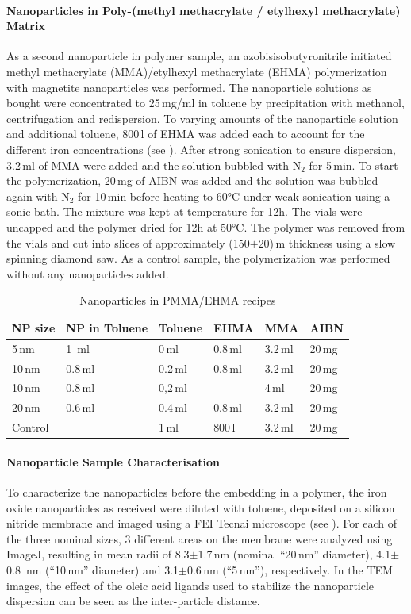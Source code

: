 \paragraph{Nanoparticles in Poly-(methyl methacrylate / etylhexyl methacrylate)  Matrix}
As a second nanoparticle in polymer sample, an azobisisobutyronitrile initiated methyl methacrylate (MMA)/etylhexyl methacrylate (EHMA) polymerization with magnetite nanoparticles was performed. 
The nanoparticle solutions as bought were concentrated to 25\,mg/ml in toluene by precipitation with methanol, centrifugation and redispersion.  To varying amounts of the nanoparticle solution and additional toluene, 800\,\textmu l of EHMA was added each to account for the different iron concentrations (see ). After strong sonication to ensure dispersion, 3.2\,ml of MMA were added and the solution  bubbled with N$_2$ for 5\,min. To start the polymerization, 20\,mg of AIBN was added and the solution was bubbled again with N$_2$  for 10\,min before heating to 60°C under weak sonication using a sonic bath. The mixture was kept at temperature for 12h.
The vials were uncapped and the polymer dried for 12h at 50°C. The polymer was removed from the vials and cut into slices of approximately (150$\pm$20)\,\textmu m thickness using a slow spinning diamond saw.
As a control sample, the polymerization was performed without any nanoparticles added.

\begin{table}[tp]
	\centering
	\caption{Nanoparticles in PMMA/EHMA recipes}
	\label{tab:sampleCP}
	\begin{tabular}{llllll}
		\hline
		NP size &NP in Toluene&Toluene & EHMA & MMA & AIBN \\
		\hline
		5\,nm&1 \,ml & 0\,ml&0.8\,ml&  3.2\,ml&   20\,mg    \\
		10\,nm& 0.8\,ml& 0.2\,ml & 0.8\,ml&  3.2\,ml&   20\,mg    \\
		10\,nm& 0.8\,ml& 0,2\,ml &            &  4\,ml   &   20\,mg    \\
		20\,nm& 0.6\,ml& 0.4\,ml& 0.8\,ml&  3.2\,ml&   20\,mg    \\
		Control&           & 1\,ml     &800\,\textmu l&  3.2\,ml&   20\,mg    \\
		\hline
	\end{tabular}
\end{table}

\paragraph{Nanoparticle Sample Characterisation}
To characterize the nanoparticles before the embedding in a polymer, the iron oxide nanoparticles as received were diluted with toluene, deposited on a silicon nitride membrane and imaged using a FEI Tecnai microscope  (see ).  For each of the three nominal sizes, 3 different areas on the membrane were analyzed using ImageJ, resulting in mean radii of 8.3$\pm$1.7\,nm (nominal \enquote{20\,nm} diameter), 4.1$\pm$0.8 \,nm	(\enquote{10\,nm} diameter) and 3.1$\pm$0.6\,nm (\enquote{5\,nm}), respectively. In the TEM images, the effect of the oleic acid ligands used to stabilize the nanoparticle dispersion can be seen as the inter-particle distance.

